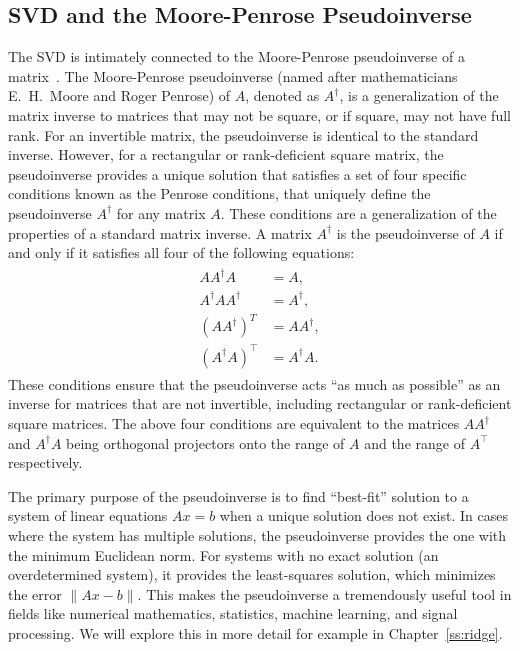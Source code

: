 \subsection{SVD and the Moore-Penrose Pseudoinverse}
\label{ss:pinv}


The SVD is intimately connected to the Moore-Penrose pseudoinverse  of a matrix~\cite{ben2003generalized}. The Moore-Penrose pseudoinverse (named after mathematicians E.~H.~Moore and Roger Penrose) of $A$, denoted as $A^\dagger$, is a generalization of the matrix inverse to matrices that may not be square, or if square, may not have full rank. For an invertible matrix, the pseudoinverse is identical to the standard inverse. However, for a rectangular or rank-deficient square matrix, the pseudoinverse provides a unique solution that satisfies a set of four specific conditions known as the Penrose conditions,
 that uniquely define the pseudoinverse $A^\dagger$ for any matrix $A$. These conditions are a generalization of the properties of a standard matrix inverse. A matrix $A^\dagger$ is the pseudoinverse of $A$ if and only if it satisfies all four of the following equations:
\begin{align}
\label{eq:pinvproperties}
\begin{split}
  AA^\dagger A & =  A, \\
  A^\dagger AA^\dagger  & =  A^\dagger, \\
  (AA^{\dagger})^{T} & =  AA^\dagger, \\
  (A^{\dagger} A)^\top   & =  A^\dagger A.
  \end{split}
\end{align}
These conditions ensure that the pseudoinverse acts ``as much as possible'' as an inverse for matrices that are not invertible, including rectangular or rank-deficient square matrices.  The above four conditions are equivalent to the matrices $A A^\dagger$ and $A^\dagger A$ being orthogonal projectors onto the range of $A$ and the range of $A^\top  $ respectively.




The primary purpose of the pseudoinverse is to find  ``best-fit'' solution to a system of linear equations $Ax=b$ when a unique solution does not exist. In cases where the system has multiple solutions, the pseudoinverse provides the one with the minimum Euclidean norm. For systems with no exact solution (an overdetermined system), it provides the least-squares solution, which minimizes the error $\|Ax - b\|$. This makes the pseudoinverse a tremendously useful tool in fields like numerical mathematics, statistics, machine learning, and signal processing. We will explore this in more detail for example in Chapter~\ref{ss:ridge}.

